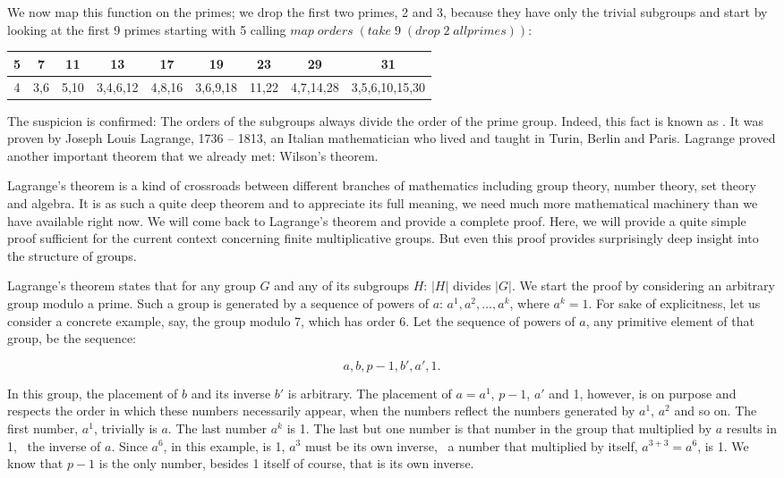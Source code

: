 \documentclass{scrreprt}
\newcommand{\Varid}[1]{\mathit{#1}}
\begin{document}
We now map this function on the primes;
we drop the first two primes, 2 and 3, 
because they have only the trivial subgroups
and start by looking at the first 9 primes
starting with 5 calling
\ensuremath{\Varid{map}\;\Varid{orders}\;(\Varid{take}\;\mathrm{9}\;(\Varid{drop}\;\mathrm{2}\;\Varid{allprimes}))}:

\begin{tabular}{c|c|c|c|c|c|c|c|c}
  5 &  7  &  11  &       13 &  17    &       19 &    23 &  29       &             31\\\hline
  4 & 3,6 & 5,10 & 3,4,6,12 & 4,8,16 & 3,6,9,18 & 11,22 & 4,7,14,28 & 3,5,6,10,15,30
\end{tabular}

The suspicion is confirmed:
The orders of the subgroups always divide
the order of the prime group.
Indeed, this fact is known as .
It was proven by 
Joseph Louis Lagrange, 1736 -- 1813,
an Italian mathematician who lived and taught
in Turin, Berlin and Paris.
Lagrange proved another important theorem 
that we already met: Wilson's theorem.

Lagrange's theorem is a kind of crossroads
between different branches of mathematics
including group theory, number theory,
set theory and algebra. 
It is as such a quite deep theorem and
to appreciate its full meaning,
we need much more mathematical machinery
than we have available right now.
We will come back to Lagrange's theorem
and provide a complete proof.
Here, we will provide a quite simple
proof sufficient for the current context
concerning finite multiplicative groups.
But even this proof provides surprisingly
deep insight into the structure of groups.

Lagrange's theorem states that for 
any group $G$ and any of its subgroups $H$:
$|H|$ divides $|G|$.
We start the proof by considering
an arbitrary group modulo a prime.
Such a group is generated by a sequence
of powers of $a$: $a^1, a^2, \dots, a^k$,
where $a^k = 1$.
For sake of explicitness, let us consider
a concrete example, say, the group modulo 7,
which has order 6.
Let the sequence of powers of $a$, any 
primitive element of that group, be the sequence:

\[
a,b,p-1,b',a',1.
\]

In this group, the placement of $b$ 
and its inverse $b'$ is arbitrary.
The placement of $a = a^1$, $p-1$, $a'$ and 1,
however, is on purpose and respects the order
in which these numbers necessarily appear,
when the numbers reflect the numbers generated
by $a^1$, $a^2$ and so on.
The first number, $a^1$, trivially is $a$.
The last number $a^k$ is 1.
The last but one number is that number in the group
that multiplied by $a$ results in 1, 
\ie\ the inverse of $a$. 
Since $a^6$, in this example, is 1, 
$a^3$ must be its own inverse, 
\ie\ a number that multiplied by itself, 
$a^{3+3}=a^6$, is 1. 
We know that $p-1$ is the only number,
besides 1 itself of course, that is its own inverse.
\end{document}
